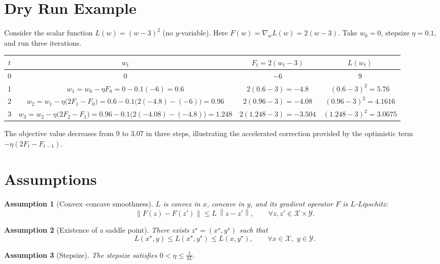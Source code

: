 \documentclass{article}
\newtheorem{assumption}{Assumption}
\newcommand{\norm}[1]{\left\|#1\right\|}
\begin{document}
\section*{Dry Run Example}
Consider the scalar function $L(w)= (w-3)^2$ (no $y$-variable).  
Here $F(w)=\nabla_w L(w)=2(w-3)$.  Take $w_0=0$, stepsize $\eta=0.1$, and run three iterations.

\begin{center}
\begin{tabular}{c|c|c|c}
$t$ & $w_t$ & $F_t=2(w_t-3)$ & $L(w_t)$\\\hline
0 & $0$ & $-6$ & $9$\\
1 & $w_1=w_0-\eta F_0=0-0.1(-6)=0.6$ & $2(0.6-3)=-4.8$ & $(0.6-3)^2=5.76$\\
2 & $w_2=w_1-\eta\bigl(2F_1-F_0\bigr)=0.6-0.1\bigl(2(-4.8)-(-6)\bigr)=0.96$ & $2(0.96-3)=-4.08$ & $(0.96-3)^2=4.1616$\\
3 & $w_3=w_2-\eta\bigl(2F_2-F_1\bigr)=0.96-0.1\bigl(2(-4.08)-(-4.8)\bigr)=1.248$ & $2(1.248-3)=-3.504$ & $(1.248-3)^2=3.0675$
\end{tabular}
\end{center}
The objective value decreases from $9$ to $3.07$ in three steps, illustrating the accelerated correction provided by the optimistic term $- \eta(2F_t-F_{t-1})$.

\newpage
\section*{Assumptions}
\begin{assumption}[Convex–concave smoothness]
\label{asm:smooth}
$L$ is convex in $x$, concave in $y$, and its gradient operator $F$ is $L$‑Lipschitz:
\[
    \norm{F(z)-F(z')}\le L\,\norm{z-z'},\qquad\forall z,z'\in\mathcal X\times\mathcal Y .
\]
\end{assumption}
\begin{assumption}[Existence of a saddle point]
\label{asm:saddle}
There exists $z^\star=(x^\star,y^\star)$ such that
\[
    L(x^\star,y)\le L(x^\star,y^\star)\le L(x,y^\star),\qquad\forall x\in\mathcal X,\;y\in\mathcal Y .
\]
\end{assumption}
\begin{assumption}[Stepsize]
\label{asm:stepsize}
The stepsize satisfies $0<\eta\le\frac{1}{4L}$.
\end{assumption}
\end{document}
